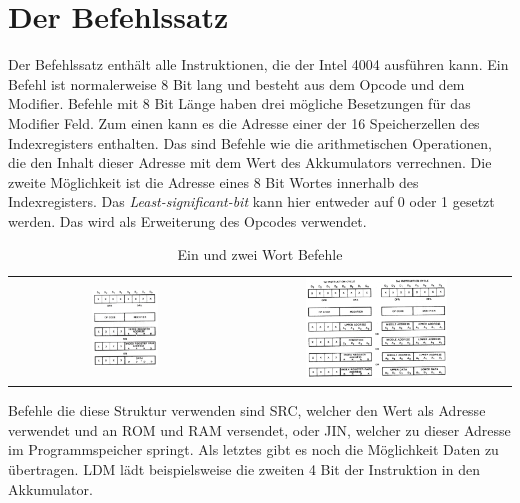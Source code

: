 \section{Der Befehlssatz}
\label{ch:befehlssatz}
Der Befehlssatz enthält alle Instruktionen, die der Intel 4004 ausführen kann. Ein Befehl ist normalerweise 8 Bit lang und besteht aus dem Opcode und dem Modifier. Befehle mit 8 Bit Länge haben drei mögliche Besetzungen für das Modifier Feld. Zum einen kann es die Adresse einer der 16 Speicherzellen des Indexregisters enthalten. Das sind Befehle wie die arithmetischen Operationen, die den Inhalt dieser Adresse mit dem Wert des Akkumulators verrechnen. Die zweite Möglichkeit ist die Adresse eines 8 Bit Wortes innerhalb des Indexregisters. Das \textit{Least-significant-bit} kann hier entweder auf 0 oder 1 gesetzt werden. Das wird als Erweiterung des Opcodes verwendet.
\begin{table}[H]
	\begin{tabular}{c c}
			 	\includegraphics[width=0.3\textwidth]{figures/instruction_one.png}
			 	\label{fig:instructions1}
			 	&
			 	\includegraphics[width=0.55\textwidth]{figures/instruction_two.png}
			 	\label{fig:instructions2}
	\end{tabular}
	\caption{Ein und zwei Wort Befehle}
\end{table}
Befehle die diese Struktur verwenden sind SRC, welcher den Wert als Adresse verwendet und an ROM und RAM versendet, oder JIN, welcher zu dieser Adresse im Programmspeicher springt. Als letztes gibt es noch die Möglichkeit Daten zu übertragen. LDM lädt beispielsweise die zweiten 4 Bit der Instruktion in den Akkumulator.
